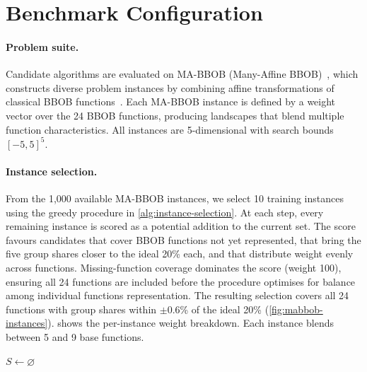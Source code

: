\section{Benchmark Configuration}
\label{sec:meth-benchmark}

\paragraph{Problem suite.}
Candidate algorithms are evaluated on MA-BBOB (Many-Affine BBOB)~\cite{vermetten2023mabbob}, which constructs diverse problem instances by combining affine transformations of classical BBOB functions~\cite{hansen2021coco}. Each MA-BBOB instance is defined by a weight vector over the 24 BBOB functions, producing landscapes that blend multiple function characteristics. All instances are 5-dimensional with search bounds $[-5, 5]^5$.

\paragraph{Instance selection.}
From the 1{,}000 available MA-BBOB instances, we select 10 training instances using the greedy procedure in \cref{alg:instance-selection}. At each step, every remaining instance is scored as a potential addition to the current set. The score favours candidates that cover BBOB functions not yet represented, that bring the five group shares closer to the ideal 20\% each, and that distribute weight evenly across functions. Missing-function coverage dominates the score (weight 100), ensuring all 24 functions are included before the procedure optimises for balance among individual functions representation. The resulting selection covers all 24 functions with group shares within $\pm$0.6\% of the ideal 20\% (\cref{fig:mabbob-instances}).  shows the per-instance weight breakdown. Each instance blends between 5 and 9 base functions.

\begin{algorithm}[t]
\caption{Greedy MA-BBOB instance selection. At each step the candidate whose addition most reduces missing-function count, group imbalance, and per-function weight variability is selected.}
\label{alg:instance-selection}
$S \gets \varnothing$\;
\end{algorithm}

